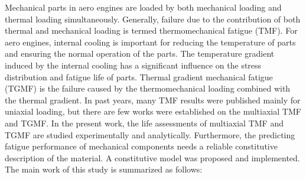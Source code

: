 \noindent
Mechanical parts in aero engines are loaded by both mechanical loading and thermal loading simultaneously. Generally, failure due to the contribution of both thermal and mechanical loading is termed thermomechanical fatigue (TMF). For aero engines, internal cooling is important for reducing the temperature of parts and ensuring the normal operation of the parts. The temperature gradient induced by the internal cooling has a significant influence on the stress distribution and fatigue life of parts. Thermal gradient mechanical fatigue (TGMF) is the failure caused by the thermomechanical loading combined with the thermal gradient. In past years, many TMF results were published mainly for uniaxial loading, but there are few works were established on the multiaxial TMF and TGMF. In the present work, the life assessments of multiaxial TMF and TGMF are studied experimentally and analytically. Furthermore, the predicting fatigue performance of mechanical components needs a reliable constitutive description of the material. A constitutive model was proposed and implemented. The main work of this study is summarized as follows:

